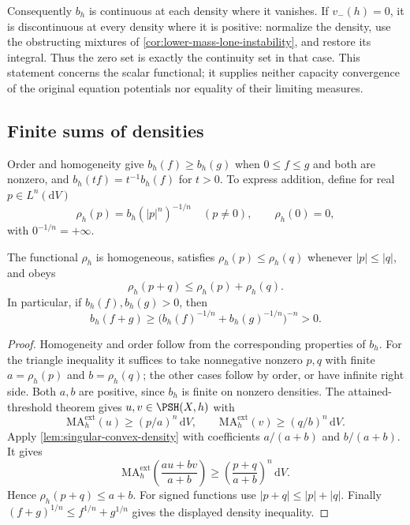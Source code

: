Consequently $b_h$ is continuous at each density where it vanishes. If $v_-(h)=0$, it is discontinuous at every density where it is positive: normalize the density, use the obstructing mixtures of \cref{cor:lower-mass-lone-instability}, and restore its integral. Thus the zero set is exactly the continuity set in that case. This statement concerns the scalar functional; it supplies neither capacity convergence of the original equation potentials nor equality of their limiting measures.

\subsection{Finite sums of densities}

Order and homogeneity give $b_h(f)\geq b_h(g)$ when $0\leq f\leq g$ and both are nonzero, and $b_h(tf)=t^{-1}b_h(f)$ for $t>0$. To express addition, define for real $p\in L^n(\mathrm{d}V)$
\[
 \rho_h(p)=b_h(|p|^n)^{-1/n}\quad(p\ne0),\qquad \rho_h(0)=0,
\]
with $0^{-1/n}=+\infty$.

\begin{proposition}\label{prop:individual-root-triangle}
The functional $\rho_h$ is homogeneous, satisfies
$\rho_h(p)\leq\rho_h(q)$ whenever $|p|\leq|q|$, and obeys
\[
 \rho_h(p+q)\leq\rho_h(p)+\rho_h(q).
\]
In particular, if $b_h(f),b_h(g)>0$, then
\[
 b_h(f+g)\geq
       \bigl(b_h(f)^{-1/n}+b_h(g)^{-1/n}\bigr)^{-n}>0.
\]
\end{proposition}
\begin{proof}
Homogeneity and order follow from the corresponding properties of $b_h$. For the triangle inequality it suffices to take nonnegative nonzero $p,q$ with finite $a=\rho_h(p)$ and $b=\rho_h(q)$; the other cases follow by order, or have infinite right side. Both $a,b$ are positive, since $b_h$ is finite on nonzero densities. The attained-threshold theorem gives $u,v\in\PSH(X,h)$ with
\[
 \mathrm{MA}^{\mathrm{ext}}_h(u)\geq(p/a)^n\,\mathrm{d}V,
 \qquad
 \mathrm{MA}^{\mathrm{ext}}_h(v)\geq(q/b)^n\,\mathrm{d}V.
\]
Apply \cref{lem:singular-convex-density} with coefficients $a/(a+b)$ and $b/(a+b)$. It gives
\[
 \mathrm{MA}^{\mathrm{ext}}_h\left(\frac{au+bv}{a+b}\right)
       \geq\left(\frac{p+q}{a+b}\right)^n\,\mathrm{d}V.
\]
Hence $\rho_h(p+q)\leq a+b$. For signed functions use $|p+q|\leq|p|+|q|$. Finally $(f+g)^{1/n}\leq f^{1/n}+g^{1/n}$ gives the displayed density inequality.
\end{proof}

